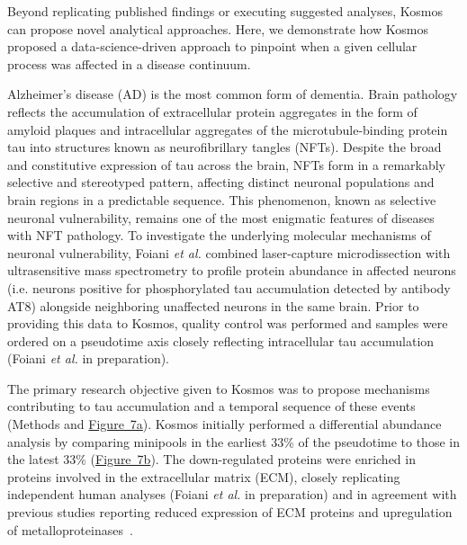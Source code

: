 \documentclass{article}
\begin{document}
Beyond replicating published findings or executing suggested analyses, Kosmos can propose novel analytical approaches. Here, we demonstrate how Kosmos proposed a data-science-driven approach to pinpoint when a given cellular process was affected in a disease continuum. 

Alzheimer's disease (AD) is the most common form of dementia. Brain pathology reflects the accumulation of extracellular protein aggregates in the form of amyloid plaques and intracellular aggregates of the microtubule-binding protein tau into structures known as neurofibrillary tangles (NFTs). Despite the broad and constitutive expression of tau across the brain, NFTs form in a remarkably selective and stereotyped pattern, affecting distinct neuronal populations and brain regions in a predictable sequence. This phenomenon, known as selective neuronal vulnerability, remains one of the most enigmatic features of diseases with NFT pathology. To investigate the underlying molecular mechanisms of neuronal vulnerability, Foiani \textit{et al.} combined laser-capture microdissection with ultrasensitive mass spectrometry to profile protein abundance in affected neurons (i.e. neurons positive for phosphorylated tau accumulation detected by antibody AT8) alongside neighboring unaffected neurons in the same brain. Prior to providing this data to Kosmos, quality control was performed and samples were ordered on a pseudotime axis closely reflecting intracellular tau accumulation (Foiani \textit{et al.} in preparation).

The primary research objective given to Kosmos was to propose mechanisms contributing to tau accumulation and a temporal sequence of these events (Methods and \hyperref[fig:fig7]{Figure~7a}). Kosmos initially performed a differential abundance analysis by comparing minipools in the earliest 33\% of the pseudotime to those in the latest 33\% (\hyperref[fig:fig7]{Figure~7b}). The down-regulated proteins were enriched in proteins involved in the extracellular matrix (ECM), closely replicating independent human analyses (Foiani \textit{et al.} in preparation) and in agreement with previous studies reporting reduced expression of ECM proteins and upregulation of metalloproteinases~\cite{schmidt_tau_2022}.
\end{document}
